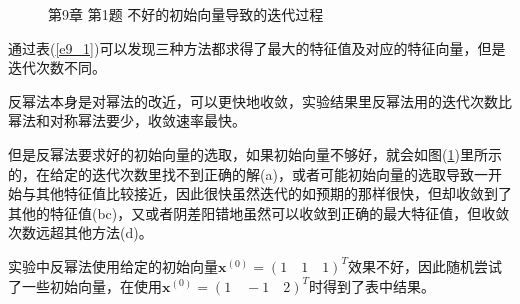 \documentclass[12pt]{ctexart}
\begin{document}
\begin{figure}[htbp]
{		} \quad
		\caption{第9章 第1题 不好的初始向量导致的迭代过程}\label{e9_1_1}
	\end{figure}
	
	通过表(\ref{e9_1})可以发现三种方法都求得了最大的特征值及对应的特征向量，但是迭代次数不同。
	
	反幂法本身是对幂法的改近，可以更快地收敛，实验结果里反幂法用的迭代次数比幂法和对称幂法要少，收敛速率最快。
	
	但是反幂法要求好的初始向量的选取，如果初始向量不够好，就会如图(\ref{e9_1_1})里所示的，在给定的迭代次数里找不到正确的解(a)，或者可能初始向量的选取导致一开始与其他特征值比较接近，因此很快虽然迭代的如预期的那样很快，但却收敛到了其他的特征值(bc)，又或者阴差阳错地虽然可以收敛到正确的最大特征值，但收敛次数远超其他方法(d)。
	
	实验中反幂法使用给定的初始向量$\textbf{x}^{(0)}=(1\quad1\quad1)^T$效果不好，因此随机尝试了一些初始向量，在使用$\textbf{x}^{(0)}=(1\quad-1\quad2)^T$时得到了表中结果。
	
\end{document}
